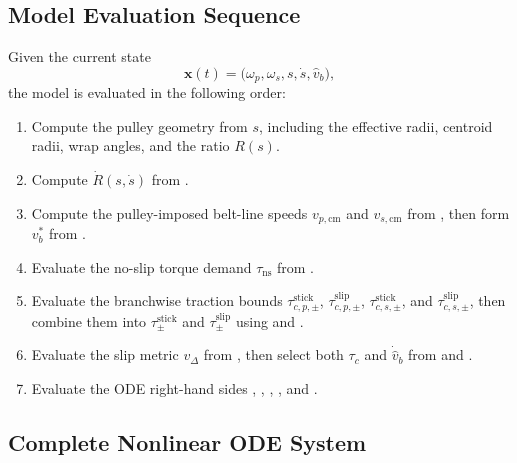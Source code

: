 \documentclass[11pt]{article}
\numberwithin{equation}{section}
\begin{document}
\subsection{Model Evaluation Sequence}

Given the current state
\[
\mathbf{x}(t)=\big(\omega_p,\omega_s,s,\dot s,\hat v_b\big),
\]
the model is evaluated in the following order:

\begin{enumerate}
    \item Compute the pulley geometry from \(s\), including the effective
    radii, centroid radii, wrap angles, and the ratio \(R(s)\).

    \item Compute \(\dot R(s,\dot s)\) from .

    \item Compute the pulley-imposed belt-line speeds
    \(v_{p,\mathrm{cm}}\) and \(v_{s,\mathrm{cm}}\) from
    , then form \(v_b^\ast\) from
    .

    \item Evaluate the no-slip torque demand \(\tau_{\mathrm{ns}}\) from
    .

    \item Evaluate the branchwise traction bounds
    \(\tau_{c,p,\pm}^{\mathrm{stick}}\),
    \(\tau_{c,p,\pm}^{\mathrm{slip}}\),
    \(\tau_{c,s,\pm}^{\mathrm{stick}}\),
    and \(\tau_{c,s,\pm}^{\mathrm{slip}}\), then combine them into
    \(\tau_\pm^{\mathrm{stick}}\) and \(\tau_\pm^{\mathrm{slip}}\) using
     and
    .

    \item Evaluate the slip metric \(v_{\Delta}\) from
    , then select both \(\tau_c\) and
    \(\dot{\hat v}_b\) from  and
    .

    \item Evaluate the ODE right-hand sides
    ,
    ,
    ,
    ,
    and .
\end{enumerate}

\subsection{Complete Nonlinear ODE System}
\end{document}
